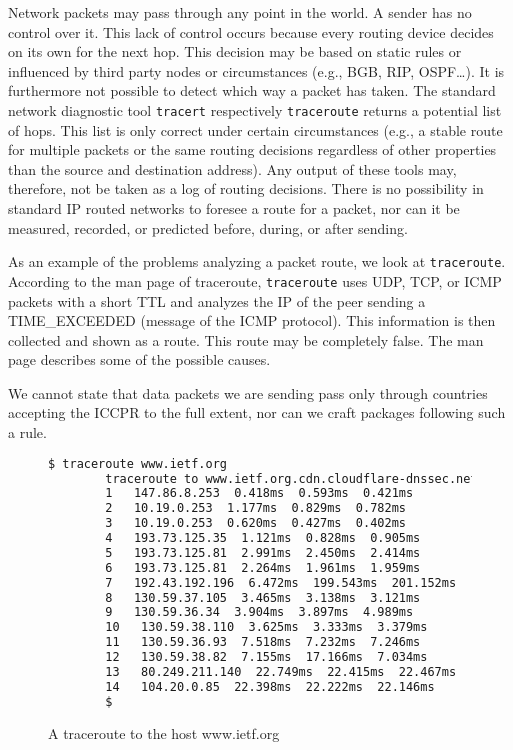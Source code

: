 Network packets may pass through any point in the world. A sender has no control over it. This lack of control occurs because every routing device decides on its own for the next hop. This decision may be based on static rules or influenced by third party nodes or circumstances (e.g., BGB, RIP, OSPF\ldots). It is furthermore not possible to detect which way a packet has taken. The standard network diagnostic tool \verb|tracert| respectively \verb|traceroute| returns a potential list of hops. This list is only correct under certain circumstances (e.g., a stable route for multiple packets or the same routing decisions regardless of other properties than the source and destination address). Any output of these tools may, therefore, not be taken as a log of routing decisions. There is no possibility in standard IP routed networks to foresee a route for a packet, nor can it be measured, recorded, or predicted before, during, or after sending. 

As an example of the problems analyzing a packet route, we look at \verb|traceroute|. According to the man page of traceroute, \verb|traceroute| uses UDP, TCP, or ICMP packets with a short TTL and analyzes the IP of the peer sending a TIME\_EXCEEDED (message of the ICMP protocol). This information is then collected and shown as a route. This route may be completely false. The man page describes some of the possible causes.

We cannot state that data packets we are sending pass only through countries accepting the ICCPR to the full extent, nor can we craft packages following such a rule.

\begin{figure}[H]
	\begin{lstlisting}[language=bash,breaklines=true,basicstyle=\tiny]
		$ traceroute www.ietf.org
		traceroute to www.ietf.org.cdn.cloudflare-dnssec.net (104.20.0.85), 64 hops max
		1   147.86.8.253  0.418ms  0.593ms  0.421ms
		2   10.19.0.253  1.177ms  0.829ms  0.782ms
		3   10.19.0.253  0.620ms  0.427ms  0.402ms
		4   193.73.125.35  1.121ms  0.828ms  0.905ms
		5   193.73.125.81  2.991ms  2.450ms  2.414ms
		6   193.73.125.81  2.264ms  1.961ms  1.959ms
		7   192.43.192.196  6.472ms  199.543ms  201.152ms
		8   130.59.37.105  3.465ms  3.138ms  3.121ms
		9   130.59.36.34  3.904ms  3.897ms  4.989ms
		10   130.59.38.110  3.625ms  3.333ms  3.379ms
		11   130.59.36.93  7.518ms  7.232ms  7.246ms
		12   130.59.38.82  7.155ms  17.166ms  7.034ms
		13   80.249.211.140  22.749ms  22.415ms  22.467ms
		14   104.20.0.85  22.398ms  22.222ms  22.146ms
		$
	\end{lstlisting}
	\caption{A traceroute to the host www.ietf.org}
\end{figure}

